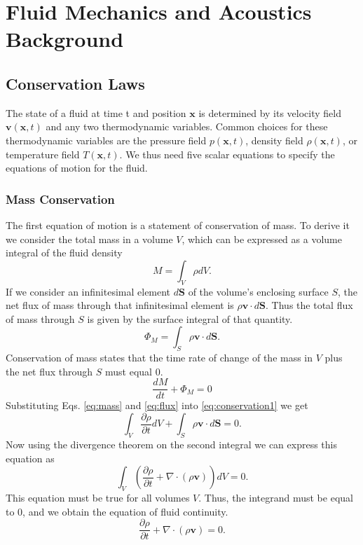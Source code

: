 \documentclass[12pt, letter]{report}
\begin{document}
\chapter{Fluid Mechanics and Acoustics Background}
\section{Conservation Laws}
The state of a fluid at time t and position $\textbf{x}$ is determined by its velocity field $\textbf{v}(\textbf{x}, t)$ and any two thermodynamic variables. Common choices for these thermodynamic variables are the pressure field $p(\textbf{x}, t)$, density field $\rho(\textbf{x}, t)$, or temperature field $T(\textbf{x}, t)$. We thus need five scalar equations to specify the equations of motion for the fluid.

\subsection{Mass Conservation}
The first equation of motion is a statement of conservation of mass. To derive it we consider the total mass in a volume $V$, which can be expressed as a volume integral of the fluid density
\begin{equation}
\label{eq:mass}
M = \int_V \rho dV.
\end{equation}
If we consider an infinitesimal element $d\textbf{S}$ of the volume's enclosing surface $S$, the net flux of mass through that infinitesimal element is $\rho \textbf{v} \cdot d\textbf{S}$. Thus the total flux of mass through $S$ is given by the surface integral of that quantity.
\begin{equation}
\label{eq:flux}
\Phi_M = \int_S \rho \textbf{v} \cdot d\textbf{S}.
\end{equation}
Conservation of mass states that the time rate of change of the mass in $V$ plus the net flux through $S$ must equal $0$.
\begin{equation}
\label{eq:conservation1}
\frac{d M}{d t} + \Phi_M = 0
\end{equation}
Substituting Eqs. \ref{eq:mass} and \ref{eq:flux} into \ref{eq:conservation1} we get
\begin{equation}
\int_V \frac{\partial \rho}{\partial t} dV + \int_S \rho \textbf{v} \cdot d\textbf{S} = 0.
\end{equation}
Now using the divergence theorem on the second integral we can express this equation as
\begin{equation}
\int_V \left(\frac{\partial \rho}{\partial t} + \nabla \cdot \left( \rho \textbf{v} \right)\right) dV = 0.
\end{equation}
This equation must be true for all volumes $V$. Thus, the integrand must be equal to $0$, and we obtain the equation of fluid continuity.
\begin{equation}
\label{eq:continuity}
\frac{\partial \rho}{\partial t} + \nabla \cdot \left( \rho \textbf{v} \right)=0.
\end{equation}
\end{document}
